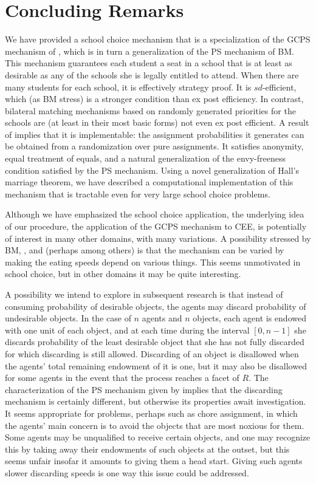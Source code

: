 \documentclass[12pt]{article}
\theoremstyle{definition}
\begin{document}
\section{Concluding Remarks} \label{sec:Conclusion}

We have provided a school choice mechanism that is a specialization of
the GCPS mechanism of \cite{balbuzanov22jet}, which is in turn a
generalization of the PS mechanism of BM.  This mechanism guarantees
each student a seat in a school that is at least as desirable as any
of the schools she is legally entitled to attend.  When there are many
students for each school, it is effectively strategy proof.  It is
$sd$-efficient, which (as BM stress) is a stronger condition than ex
post efficiency.  In contrast, bilateral matching mechanisms based on
randomly generated priorities for the schools are (at least in their
most basic forms) not even ex post efficient.  A result of
\cite{bckm13aer} implies that it is implementable: the assignment
probabilities it generates can be obtained from a randomization over
pure assignments.  It satisfies anonymity, equal treatment of equals,
and a natural generalization of the envy-freeness condition satisfied
by the PS mechanism.  Using a novel generalization of Hall's marriage
theorem, we have described a computational implementation of this
mechanism that is tractable even for very large school choice
problems.

Although we have emphasized the school choice application, the underlying idea of our procedure, the application of the GCPS mechanism to CEE, is potentially of interest in many other domains, with many variations.  A possibility stressed by BM, \cite{cho18scw}, and \cite{balbuzanov22jet} (perhaps among others) is that the mechanism can be varied by making the eating speeds depend on various things.  This seems unmotivated in school choice, but in other domains it may be quite interesting.

A possibility we intend to explore in subsequent research is that instead of consuming probability of desirable objects, the agents may discard probability of undesirable objects.  In the case of $n$ agents and $n$ objects, each agent is endowed with one unit of each object, and at each time during the interval $[0,n-1]$ she discards probability of the least desirable object that she has not fully discarded for which discarding is still allowed.  Discarding of an object is disallowed when the agents' total remaining endowment of it is one, but it may also be disallowed for some agents in the event that the process reaches a facet of $R$.  The characterization of the PS mechanism given by \cite{bh12} implies that the discarding mechanism is certainly different, but otherwise its properties await investigation.  It seems appropriate for problems, perhaps such as chore assignment, in which the agents' main concern is to avoid the objects that are most noxious for them.  Some agents may be unqualified to receive certain objects, and one may recognize this by taking away their endowments of such objects at the outset, but this seems unfair insofar it amounts to giving them a head start.  Giving such agents slower discarding speeds is one way this issue could be addressed.
\end{document}

